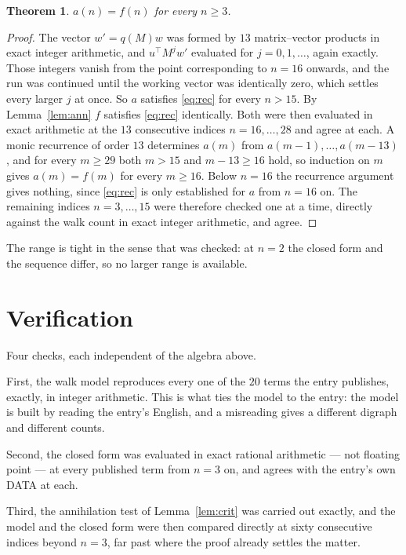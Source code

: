 \documentclass[11pt,a4paper]{article}
\theoremstyle{plain}
\newtheorem{theorem}{Theorem}
\theoremstyle{definition}
\begin{document}
\begin{theorem}
$a(n)=f(n)$ for every $n\ge3$.
\end{theorem}

\begin{proof}
The vector $w'=q(M)w$ was formed by $13$ matrix--vector products in exact integer
arithmetic, and $u^{\!\top}M^{j}w'$ evaluated for $j=0,1,\dots$, again exactly. Those integers
vanish from the point corresponding to $n=16$ onwards, and the run was continued until the
working vector was identically zero, which settles every larger $j$ at once. So $a$ satisfies
\eqref{eq:rec} for every $n>15$. By Lemma~\ref{lem:ann} $f$ satisfies \eqref{eq:rec}
identically. Both were then evaluated in exact arithmetic at the $13$ consecutive indices
$n=16,\dots,28$ and agree at each. A monic recurrence of order $13$
determines $a(m)$ from $a(m-1),\dots,a(m-13)$, and for every $m\ge29$ both
$m>15$ and $m-13\ge16$ hold, so induction on $m$ gives $a(m)=f(m)$ for every
$m\ge16$.
Below $n=16$ the recurrence argument gives nothing, since \eqref{eq:rec} is only
established for $a$ from $n=16$ on. The remaining indices $n=3,\dots,15$ were
therefore checked one at a time, directly against the walk count in exact integer arithmetic,
and agree.
\end{proof}

The range is tight in the sense that was checked: at $n=2$ the closed form and the sequence differ, so no larger range is available.

\section{Verification}

Four checks, each independent of the algebra above.

First, the walk model reproduces every one of the $20$ terms the entry publishes,
exactly, in integer arithmetic. This is what ties the model to the entry: the model is built
by reading the entry's English, and a misreading gives a different digraph and different
counts.

Second, the closed form was evaluated in exact rational arithmetic --- not floating point ---
at every published term from $n=3$ on, and agrees with the entry's own DATA at each.

Third, the annihilation test of Lemma~\ref{lem:crit} was carried out exactly, and the model
and the closed form were then compared directly at sixty consecutive indices beyond
$n=3$, far past where the proof already settles the matter.
\end{document}
